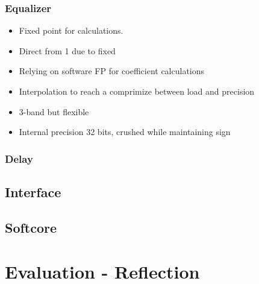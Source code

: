 \documentclass[12p]{article}
\begin{document}
\subsubsection{Equalizer}
\begin{itemize}
\item Fixed point for calculations.
\item Direct from 1 due to fixed
\item Relying on software FP for coefficient calculations
\item Interpolation to reach a comprimize between load and precision
\item 3-band but flexible
\item Internal precision 32 bits, crushed while maintaining sign
\end{itemize}
\subsubsection{Delay}

\subsection{Interface}
\label{Design:Interface}

\subsection{Softcore}
\label{Design:Softcore}





\newpage
\section{Evaluation - Reflection}
\label{Evaluation-Reflection}
\end{document}

